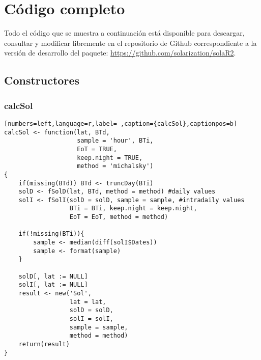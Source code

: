 \chapter{Código completo}
\label{chap:codigo-completo}

Todo el código que se muestra a continuación está disponible para descargar, consultar y modificar libremente en el repositorio de Github correspondiente a la versión de desarrollo del paquete: \url{https://github.com/solarization/solaR2}.

\section{Constructores}
\label{sec:orga6131b4}
\subsection{calcSol}
\label{sec:org3959768}
\label{subsec:calcsol}
\begin{lstlisting}[numbers=left,language=r,label= ,caption={calcSol},captionpos=b]
calcSol <- function(lat, BTd,
                    sample = 'hour', BTi,
                    EoT = TRUE,
                    keep.night = TRUE,
                    method = 'michalsky')
{
    if(missing(BTd)) BTd <- truncDay(BTi)
    solD <- fSolD(lat, BTd, method = method) #daily values
    solI <- fSolI(solD = solD, sample = sample, #intradaily values
                  BTi = BTi, keep.night = keep.night,
                  EoT = EoT, method = method)

    if(!missing(BTi)){
        sample <- median(diff(solI$Dates))
        sample <- format(sample)
    }

    solD[, lat := NULL]
    solI[, lat := NULL]
    result <- new('Sol',
                  lat = lat,
                  solD = solD,
                  solI = solI,
                  sample = sample,
                  method = method)
    return(result)
}
\end{lstlisting}
